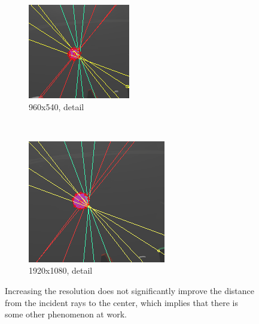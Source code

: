 \documentclass{thesis}
\begin{document}
\begin{figure}
	\centering
	\begin{subfigure}[b]{0.4\textwidth}
                \includegraphics[width=\textwidth]{lo-res-detail}
                \caption{960x540, detail}
    \end{subfigure}
    ~
   	\begin{subfigure}[b]{0.4\textwidth}
                \includegraphics[width=\textwidth]{hi-res-detail}
                \caption{1920x1080, detail}
    \end{subfigure}
    \caption{Increasing the resolution does not significantly improve the distance from the incident rays to the center, which implies that there is some other phenomenon at work.}
	\label{resolution-comparison}
\end{figure}
\end{document}
